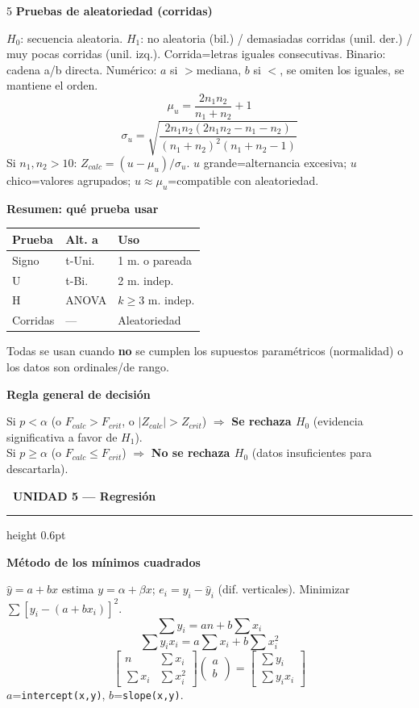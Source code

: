 \documentclass[9pt,a4paper]{article}
\newcommand{\bodysize}{\fontsize{7.5}{8.7}\selectfont}
\newcommand{\notesize}{\fontsize{6.4}{7.4}\selectfont}
\newcommand{\subsize}{\fontsize{8.6}{10}\selectfont\bfseries}
\newcommand{\unitsize}{\fontsize{9.8}{11.3}\selectfont\bfseries}
\newcommand{\unithead}[2]{%
  \par\vspace{2pt}
  \noindent\colorbox{#1!22}{\textcolor{#1!65!black}{\unitsize\ #2}}%
  \par\vspace{1pt}\hrule height 0.6pt \color{#1!55!black}\vspace{1.5pt}\color{black}%
}
\newcommand{\topic}[2]{\subsize\textcolor{#1!60!black}{#2}\par\vspace{0.5pt}\bodysize}
\begin{document}
\begin{multicols}{5}
\topic{violet}{Pruebas de aleatoriedad (corridas)}
$H_0$: secuencia aleatoria. $H_1$: no aleatoria (bil.) / demasiadas corridas (unil. der.) / muy pocas corridas (unil. izq.). Corrida=letras iguales consecutivas. Binario: cadena a/b directa. Numérico: $a$ si $>$mediana, $b$ si $<$, se omiten los iguales, se mantiene el orden.
\[
\mu_u=\frac{2n_1n_2}{n_1+n_2}+1
\]
\[
\sigma_u=\sqrt{\frac{2n_1n_2(2n_1n_2-n_1-n_2)}{(n_1+n_2)^2(n_1+n_2-1)}}
\]
Si $n_1,n_2>10$: $Z_{calc}=(u-\mu_u)/\sigma_u$. $u$ grande=alternancia excesiva; $u$ chico=valores agrupados; $u\approx\mu_u$=compatible con aleatoriedad.

\topic{violet}{Resumen: qué prueba usar}
\begin{center}
{\notesize
\setlength{\tabcolsep}{2.5pt}
\begin{tabular}{@{}l l l@{}}
\toprule
Prueba & Alt. a & Uso \\
\midrule
Signo & t-Uni. & 1 m. o pareada \\
U & t-Bi. & 2 m. indep. \\
H & ANOVA & $k{\geq}3$ m. indep. \\
Corridas & --- & Aleatoriedad \\
\bottomrule
\end{tabular}
}
\end{center}
Todas se usan cuando \textbf{no} se cumplen los supuestos paramétricos (normalidad) o los datos son ordinales/de rango.

\topic{violet}{Regla general de decisión}
\colorbox{gray!10}{\parbox{0.92\linewidth}{{\notesize
Si $p<\alpha$ (o $F_{calc}>F_{crit}$, o $|Z_{calc}|>Z_{crit}$) $\Rightarrow$ \textbf{Se rechaza $H_0$} (evidencia significativa a favor de $H_1$).\\
Si $p\geq\alpha$ (o $F_{calc}\leq F_{crit}$) $\Rightarrow$ \textbf{No se rechaza $H_0$} (datos insuficientes para descartarla).
}}}

\unithead{orange}{UNIDAD 5 --- Regresión}

\topic{orange}{Método de los mínimos cuadrados}
$\hat{y}=a+bx$ estima $y=\alpha+\beta x$; $e_i=y_i-\hat y_i$ (dif. verticales). Minimizar $\sum[y_i-(a+bx_i)]^2$.
{\notesize
\[
\sum y_i=an+b\sum x_i
\]
\[
\sum y_ix_i=a\sum x_i+b\sum x_i^2
\]
\[
\begin{bmatrix} n & \sum x_i \\ \sum x_i & \sum x_i^2 \end{bmatrix}
\begin{pmatrix} a\\b \end{pmatrix} =
\begin{bmatrix} \sum y_i \\ \sum y_ix_i \end{bmatrix}
\]
}
$a$=\texttt{intercept(x,y)}, $b$=\texttt{slope(x,y)}.


\end{multicols}
\end{document}
